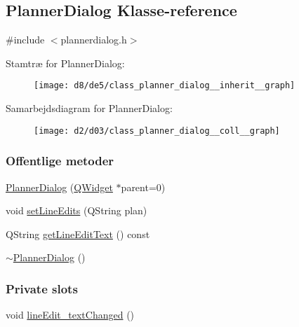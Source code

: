 \hypertarget{class_planner_dialog}{}\subsection{Planner\+Dialog Klasse-\/reference}
\label{class_planner_dialog}


{\ttfamily \#include $<$plannerdialog.\+h$>$}



Stamtræ for Planner\+Dialog\+:
\nopagebreak
\begin{figure}[H]
\begin{center}
\leavevmode
\texttt{[image: d8/de5/class\_planner\_dialog\_\_inherit\_\_graph]}
\end{center}
\end{figure}


Samarbejdsdiagram for Planner\+Dialog\+:
\nopagebreak
\begin{figure}[H]
\begin{center}
\leavevmode
\texttt{[image: d2/d03/class\_planner\_dialog\_\_coll\_\_graph]}
\end{center}
\end{figure}
\subsubsection*{Offentlige metoder}
\begin{DoxyCompactItemize}
\item 
\hyperlink{class_planner_dialog_a2f5d2ba887c4b70a3f28d78955aa1536}{Planner\+Dialog} (\hyperlink{class_q_widget}{Q\+Widget} $\ast$parent=0)
\item 
void \hyperlink{class_planner_dialog_a83441caf32a5806cfbb5f0796065d352}{set\+Line\+Edits} (Q\+String plan)
\item 
Q\+String \hyperlink{class_planner_dialog_a7c9482ec9a38bf3d4a90dadf6dc3f572}{get\+Line\+Edit\+Text} () const 
\item 
\hyperlink{class_planner_dialog_a24842220c2a6f2dde621b5ef0bde0217}{$\sim$\+Planner\+Dialog} ()
\end{DoxyCompactItemize}
\subsubsection*{Private slots}
\begin{DoxyCompactItemize}
\item 
void \hyperlink{class_planner_dialog_ad59b9da096cc8570abaf6156512b10a8}{line\+Edit\+\_\+text\+Changed} ()
\end{DoxyCompactItemize}
